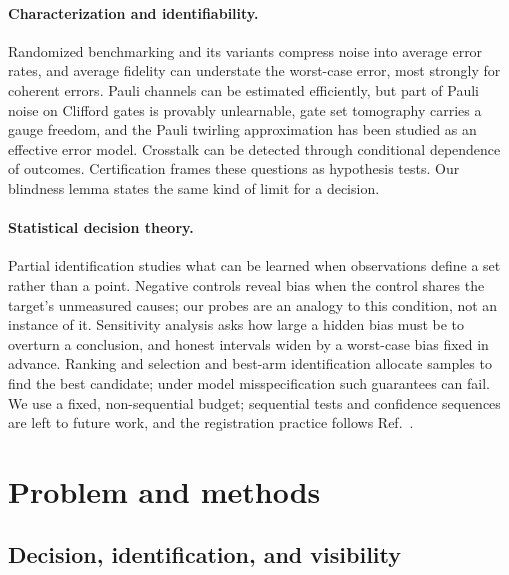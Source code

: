 \documentclass[10pt,twocolumn]{article}
\begin{document}
\paragraph{Characterization and identifiability.} Randomized benchmarking and
its variants compress noise into average error
rates\cite{magesan2011,gambetta2012,erhard2019,proctor2022mirror,proctor2022capabilities},
and average fidelity can understate the worst-case error, most strongly for
coherent errors\cite{kueng2016,sanders2016}.
Pauli channels can be estimated efficiently\cite{flammia2020pauli}, but part of
Pauli noise on Clifford gates is provably unlearnable\cite{chen2023learnability},
gate set tomography carries a gauge freedom\cite{nielsen2021gst}, and the
Pauli twirling approximation has been studied as an effective error
model\cite{geller2013}. Crosstalk can be
detected through conditional dependence of outcomes\cite{sarovar2020}.
Certification frames these questions as hypothesis tests\cite{eisert2020,kliesch2021}.
Our blindness lemma states the same kind of limit for a decision.

\paragraph{Statistical decision theory.} Partial identification studies what
can be learned when observations define a set rather than a
point\cite{imbens2004,tamer2010}. Negative controls reveal bias when the
control shares the target's unmeasured causes\cite{lipsitch2010}; our probes
are an analogy to this condition, not an instance of it. Sensitivity analysis
asks how large a hidden bias must be to overturn a
conclusion\cite{rosenbaum1987,vanderweele2017}, and honest intervals widen by
a worst-case bias fixed in advance\cite{armstrong2020}. Ranking and selection
and best-arm identification allocate samples to find the best
candidate\cite{bechhofer1954,kimnelson2006,chen2000ocba,kaufmann2016,garivier2016};
under model misspecification such guarantees can fail\cite{ghosh2017}. We use
a fixed, non-sequential budget; sequential tests and confidence
sequences\cite{wald1945,howard2021} are left to future work, and the
registration practice follows Ref.~\cite{nosek2018}.

\section{Problem and methods}

\subsection{Decision, identification, and visibility}
\end{document}
